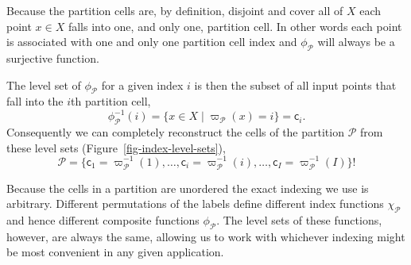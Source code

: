 \documentclass[
  letterpaper,
  DIV=11,
  numbers=noendperiod]{scrartcl}
\begin{document}
Because the partition cells are, by definition, disjoint and cover all
of \(X\) each point \(x \in X\) falls into one, and only one, partition
cell. In other words each point is associated with one and only one
partition cell index and \(\phi_{\mathcal{P}}\) will always be a
surjective function.

The level set of \(\phi_{\mathcal{P}}\) for a given index \(i\) is then
the subset of all input points that fall into the \(i\)th partition
cell, \[
\phi_{\mathcal{P}}^{-1}(i)
= \{ x \in X \mid \varpi_{\mathcal{P}}(x) = i \}
= \mathsf{c}_{i}.
\] Consequently we can completely reconstruct the cells of the partition
\(\mathcal{P}\) from these level sets
(Figure~\ref{fig-index-level-sets}), \[
\mathcal{P} = \{ \mathsf{c}_{1} = \varpi_{\mathcal{P}}^{-1}(1), \ldots,
                 \mathsf{c}_{i} = \varpi_{\mathcal{P}}^{-1}(i), \ldots,
                 \mathsf{c}_{I} = \varpi_{\mathcal{P}}^{-1}(I) \}!
\]

Because the cells in a partition are unordered the exact indexing we use
is arbitrary. Different permutations of the labels define different
index functions \(\chi_{\mathcal{P}}\) and hence different composite
functions \(\phi_{\mathcal{P}}\). The level sets of these functions,
however, are always the same, allowing us to work with whichever
indexing might be most convenient in any given application.
\end{document}
